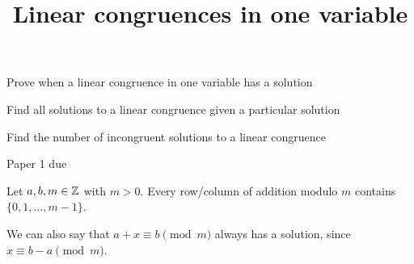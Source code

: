 \documentclass{ximera}
\title{Linear congruences in one variable}
\begin{document}
\begin{abstract}
\end{abstract}
\maketitle

\begin{obj}
	\item Prove when a linear congruence in one variable has a solution
	\item Find all solutions to a linear congruence given a particular solution
	\item Find the number of incongruent solutions to a linear congruence
\end{obj}

\begin{instructorNotes}
	\begin{pre} \item Paper 1 due
	\end{pre}
\end{instructorNotes}



\begin{remark}\label{rem:add-inverse}
	Let $a,b,m\in\mathbb Z$ with $m>0$. Every row/column of addition modulo $m$ contains $\{0,1,\dots,m-1\}$. 

	We can also say that $a+x\equiv b\pmod m$ always has a solution, since $x\equiv b-a\pmod m$.
\end{remark}
\end{document}
